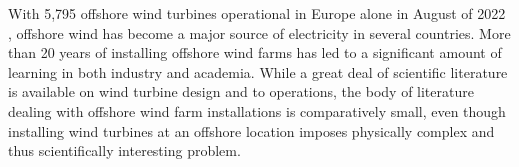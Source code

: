 \documentclass[wes, manuscript]{copernicus}
\begin{document}


\introduction  %

With 5,795 offshore wind turbines operational in Europe alone in August of 2022 \citep{windeuropeorg_offshore_2022},
offshore wind has become a major source of electricity in several countries. More than 20 years of installing offshore wind farms has led to a significant amount of learning in both industry and academia. While a great deal of scientific literature is available on wind turbine design and to  operations, the body of 
literature dealing with offshore wind farm installations is comparatively small, even though installing wind turbines at an offshore location imposes physically complex and thus scientifically interesting problem. 
\end{document}
